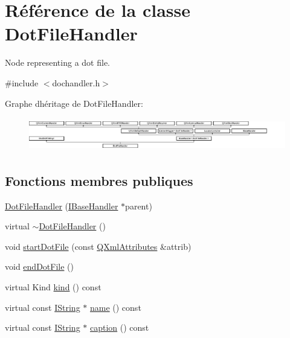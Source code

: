 \hypertarget{class_dot_file_handler}{}\section{Référence de la classe Dot\+File\+Handler}
\label{class_dot_file_handler}


Node representing a dot file.  




{\ttfamily \#include $<$dochandler.\+h$>$}

Graphe d\textquotesingle{}héritage de Dot\+File\+Handler\+:\begin{figure}[H]
\begin{center}
\leavevmode
\includegraphics[height=1.474654cm]{class_dot_file_handler}
\end{center}
\end{figure}
\subsection*{Fonctions membres publiques}
\begin{DoxyCompactItemize}
\item 
\hyperlink{class_dot_file_handler_a6e2366630778c0d6e2e41cc9208866bd}{Dot\+File\+Handler} (\hyperlink{class_i_base_handler}{I\+Base\+Handler} $\ast$parent)
\item 
virtual \hyperlink{class_dot_file_handler_a9567731830785b5991e90c9272cd37ac}{$\sim$\+Dot\+File\+Handler} ()
\item 
void \hyperlink{class_dot_file_handler_a8359f486d61c0de4124f617d24e7f4d3}{start\+Dot\+File} (const \hyperlink{class_q_xml_attributes}{Q\+Xml\+Attributes} \&attrib)
\item 
void \hyperlink{class_dot_file_handler_acfa69c7201288348f6e3256c9ea268fa}{end\+Dot\+File} ()
\item 
virtual Kind \hyperlink{class_dot_file_handler_a2f53f339e814a10f8f39c14b5b928a83}{kind} () const 
\item 
virtual const \hyperlink{class_i_string}{I\+String} $\ast$ \hyperlink{class_dot_file_handler_a8254017556c61071799f5d1d328d79f6}{name} () const 
\item 
virtual const \hyperlink{class_i_string}{I\+String} $\ast$ \hyperlink{class_dot_file_handler_a95f7fd571f936d5449b8f7f4f373f881}{caption} () const 
\end{DoxyCompactItemize}
